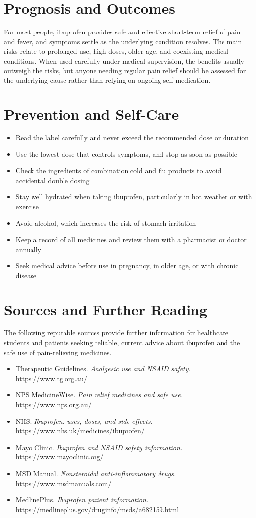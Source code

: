\section*{Prognosis and Outcomes}
For most people, ibuprofen provides safe and effective short-term relief of pain and fever, and symptoms settle as the underlying condition resolves. The main risks relate to prolonged use, high doses, older age, and coexisting medical conditions. When used carefully under medical supervision, the benefits usually outweigh the risks, but anyone needing regular pain relief should be assessed for the underlying cause rather than relying on ongoing self-medication.

\section*{Prevention and Self-Care}
\begin{itemize}
    \item Read the label carefully and never exceed the recommended dose or duration
    \item Use the lowest dose that controls symptoms, and stop as soon as possible
    \item Check the ingredients of combination cold and flu products to avoid accidental double dosing
    \item Stay well hydrated when taking ibuprofen, particularly in hot weather or with exercise
    \item Avoid alcohol, which increases the risk of stomach irritation
    \item Keep a record of all medicines and review them with a pharmacist or doctor annually
    \item Seek medical advice before use in pregnancy, in older age, or with chronic disease
\end{itemize}

\section*{Sources and Further Reading}
The following reputable sources provide further information for healthcare students and patients seeking reliable, current advice about ibuprofen and the safe use of pain-relieving medicines.
\begin{itemize}
    \item Therapeutic Guidelines. \textit{Analgesic use and NSAID safety.} https://www.tg.org.au/
    \item NPS MedicineWise. \textit{Pain relief medicines and safe use.} https://www.nps.org.au/
    \item NHS. \textit{Ibuprofen: uses, doses, and side effects.} https://www.nhs.uk/medicines/ibuprofen/
    \item Mayo Clinic. \textit{Ibuprofen and NSAID safety information.} https://www.mayoclinic.org/
    \item MSD Manual. \textit{Nonsteroidal anti-inflammatory drugs.} https://www.msdmanuals.com/
    \item MedlinePlus. \textit{Ibuprofen patient information.} https://medlineplus.gov/druginfo/meds/a682159.html
\end{itemize}
